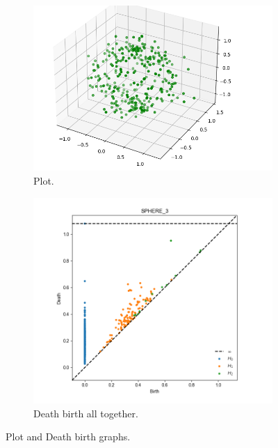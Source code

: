 \documentclass[11pt,a4paper]{report}
\begin{document}
              \begin{figure}[H]
                \centering
                \begin{subfigure}[b]{0.45\linewidth}
                  \includegraphics[width=\linewidth]{./ripser/rand_sphere.PNG}
                  \caption{Plot.}
                \end{subfigure}
                \begin{subfigure}[b]{0.45\linewidth}
                  \includegraphics[width=\linewidth]{./ripser/rand_sphere_homology.PNG}
                  \caption{Death birth all together.}
                \end{subfigure}
                \caption{Plot and Death birth graphs.}
                \label{fig: plot death}
              \end{figure}
\end{document}
